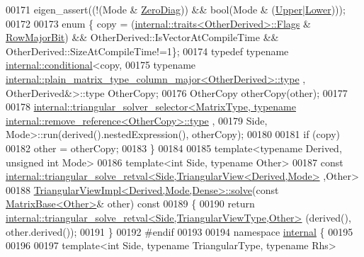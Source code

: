\begin{DoxyCode}
00171   eigen\_assert((!(Mode & \hyperlink{group__enums_gga39e3366ff5554d731e7dc8bb642f83cda884ff7240392e85aa6e4b3c957e36483}{ZeroDiag})) && \textcolor{keywordtype}{bool}(Mode & (\hyperlink{group__enums_gga39e3366ff5554d731e7dc8bb642f83cda6bcb58be3b8b8ec84859ce0c5ac0aaec}{Upper}|\hyperlink{group__enums_gga39e3366ff5554d731e7dc8bb642f83cda891792b8ed394f7607ab16dd716f60e6}{Lower})));
00172 
00173   \textcolor{keyword}{enum} \{ copy = (\hyperlink{struct_eigen_1_1internal_1_1traits}{internal::traits<OtherDerived>::Flags} & 
      \hyperlink{group__flags_gae4f56c2a60bbe4bd2e44c5b19cbe8762}{RowMajorBit})  && OtherDerived::IsVectorAtCompileTime && OtherDerived::SizeAtCompileTime!=1\};
00174   \textcolor{keyword}{typedef} \textcolor{keyword}{typename} \hyperlink{struct_eigen_1_1internal_1_1conditional}{internal::conditional}<copy,
00175     \textcolor{keyword}{typename} \hyperlink{group___core___module_class_eigen_1_1_matrix}{internal::plain\_matrix\_type\_column\_major<OtherDerived>::type}
      , OtherDerived&>::type OtherCopy;
00176   OtherCopy otherCopy(other);
00177 
00178   
      \hyperlink{struct_eigen_1_1internal_1_1triangular__solver__selector}{internal::triangular\_solver\_selector<MatrixType, typename internal::remove\_reference<OtherCopy>::type}
      ,
00179     Side, Mode>::run(derived().nestedExpression(), otherCopy);
00180 
00181   \textcolor{keywordflow}{if} (copy)
00182     other = otherCopy;
00183 \}
00184 
00185 \textcolor{keyword}{template}<\textcolor{keyword}{typename} Derived, \textcolor{keywordtype}{unsigned} \textcolor{keywordtype}{int} Mode>
00186 \textcolor{keyword}{template}<\textcolor{keywordtype}{int} S\textcolor{keywordtype}{id}e, \textcolor{keyword}{typename} Other>
00187 \textcolor{keyword}{const} \hyperlink{struct_eigen_1_1internal_1_1triangular__solve__retval}{internal::triangular\_solve\_retval<Side,TriangularView<Derived,Mode>}
      ,Other>
00188 \hyperlink{class_eigen_1_1_triangular_view_impl}{TriangularViewImpl<Derived,Mode,Dense>::solve}(\textcolor{keyword}{const} 
      \hyperlink{group___core___module_class_eigen_1_1_matrix_base}{MatrixBase<Other>}& other)\textcolor{keyword}{ const}
00189 \textcolor{keyword}{}\{
00190   \textcolor{keywordflow}{return} \hyperlink{struct_eigen_1_1internal_1_1triangular__solve__retval}{internal::triangular\_solve\_retval<Side,TriangularViewType,Other>}
      (derived(), other.derived());
00191 \}
00192 \textcolor{preprocessor}{#endif}
00193 
00194 \textcolor{keyword}{namespace }\hyperlink{namespaceinternal}{internal} \{
00195 
00196 
00197 \textcolor{keyword}{template}<\textcolor{keywordtype}{int} S\textcolor{keywordtype}{id}e, \textcolor{keyword}{typename} TriangularType, \textcolor{keyword}{typename} Rhs>

\end{DoxyCode}
